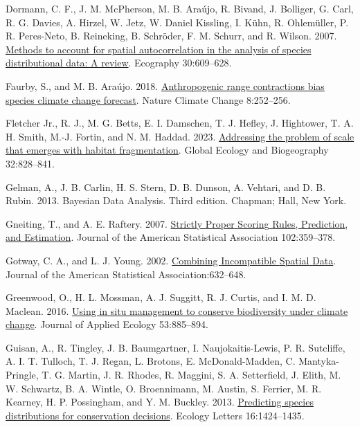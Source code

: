 \documentclass[
  12pt,
  a4paper]{article}
\newlength{\cslhangindent}
\newlength{\cslentryspacingunit} %
\newenvironment{CSLReferences}[2] %
 {%
  \setlength{\parindent}{0pt}
  \ifodd #1
  \let\oldpar\par
  \def\par{\hangindent=\cslhangindent\oldpar}
  \fi
  \setlength{\parskip}{#2\cslentryspacingunit}
 }%
 {}
\begin{document}
\begin{CSLReferences}{1}{0}
\leavevmode{}%
Dormann, C. F., J. M. McPherson, M. B. Araújo, R. Bivand, J. Bolliger, G. Carl, R. G. Davies, A. Hirzel, W. Jetz, W. Daniel Kissling, I. Kühn, R. Ohlemüller, P. R. Peres-Neto, B. Reineking, B. Schröder, F. M. Schurr, and R. Wilson. 2007. \href{https://doi.org/10.1111/j.2007.0906-7590.05171.x}{Methods to account for spatial autocorrelation in the analysis of species distributional data: A review}. Ecography 30:609--628.

\leavevmode{}%
Faurby, S., and M. B. Araújo. 2018. \href{https://doi.org/10.1038/s41558-018-0089-x}{Anthropogenic range contractions bias species climate change forecast}. Nature Climate Change 8:252--256.

\leavevmode{}%
Fletcher Jr., R. J., M. G. Betts, E. I. Damschen, T. J. Hefley, J. Hightower, T. A. H. Smith, M.-J. Fortin, and N. M. Haddad. 2023. \href{https://doi.org/10.1111/geb.13658}{Addressing the problem of scale that emerges with habitat fragmentation}. Global Ecology and Biogeography 32:828--841.

\leavevmode{}%
Gelman, A., J. B. Carlin, H. S. Stern, D. B. Dunson, A. Vehtari, and D. B. Rubin. 2013. Bayesian {Data} {Analysis}. Third edition. Chapman; Hall, New York.

\leavevmode{}%
Gneiting, T., and A. E. Raftery. 2007. \href{https://doi.org/10.1198/016214506000001437}{Strictly {Proper} {Scoring} {Rules}, {Prediction}, and {Estimation}}. Journal of the American Statistical Association 102:359--378.

\leavevmode{}%
Gotway, C. A., and L. J. Young. 2002. \href{https://doi.org/10.1198/016214502760047140}{Combining {Incompatible} {Spatial} {Data}}. Journal of the American Statistical Association:632--648.

\leavevmode{}%
Greenwood, O., H. L. Mossman, A. J. Suggitt, R. J. Curtis, and I. M. D. Maclean. 2016. \href{https://doi.org/10.1111/1365-2664.12602}{Using in situ management to conserve biodiversity under climate change}. Journal of Applied Ecology 53:885--894.

\leavevmode{}%
Guisan, A., R. Tingley, J. B. Baumgartner, I. Naujokaitis-Lewis, P. R. Sutcliffe, A. I. T. Tulloch, T. J. Regan, L. Brotons, E. McDonald-Madden, C. Mantyka-Pringle, T. G. Martin, J. R. Rhodes, R. Maggini, S. A. Setterfield, J. Elith, M. W. Schwartz, B. A. Wintle, O. Broennimann, M. Austin, S. Ferrier, M. R. Kearney, H. P. Possingham, and Y. M. Buckley. 2013. \href{https://doi.org/10.1111/ele.12189}{Predicting species distributions for conservation decisions}. Ecology Letters 16:1424--1435.


\end{CSLReferences}
\end{document}
